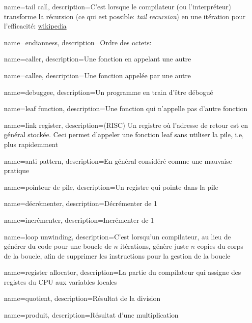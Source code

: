 {
  name={tail call},
  description={C'est lorsque le compilateur (ou l'interpréteur) transforme la récursion (ce qui est possible: \emph{tail recursion})
  en une itération pour l'efficacité: \href{http://go.yurichev.com/17105}{wikipedia}}
}

{
  name=endianness,
  description={Ordre des octets: }
}

{
  name=caller,
  description={Une fonction en appelant une autre}
}

{
  name=callee,
  description={Une fonction appelée par une autre}
}

{
  name=debuggee,
  description={Un programme en train d'être débogué}
}

{
  name=leaf function,
  description={Une fonction qui n'appelle pas d'autre fonction}
}

{
  name=link register,
  description={(RISC) Un registre où l'adresse de retour est en général stockée. Ceci permet
  d'appeler une fonction leaf sans utiliser la pile, i.e, plus rapidemment}
}

{
  name=anti-pattern,
  description={En général considéré comme une mauvaise pratique}
}

{
  name=pointeur de pile,
  description={Un registre qui pointe dans la pile}
}

{
  name=décrémenter,
  description={Décrémenter de 1}
}

{
  name=incrémenter,
  description={Incrémenter de 1}
}

{
  name=loop unwinding,
  description={C'est lorsqu'un compilateur, au lieu de générer du code pour une boucle de
  $n$ itérations, génère juste $n$ copies du corps de la boucle, afin de supprimer
  les instructions pour la gestion de la boucle}
}

{
  name=register allocator,
  description={La partie du compilateur qui assigne des registes du CPU aux variables locales}
}

{
  name=quotient,
  description={Résultat de la division}
}

{
  name=produit,
  description={Résultat d'une multiplication}
}

